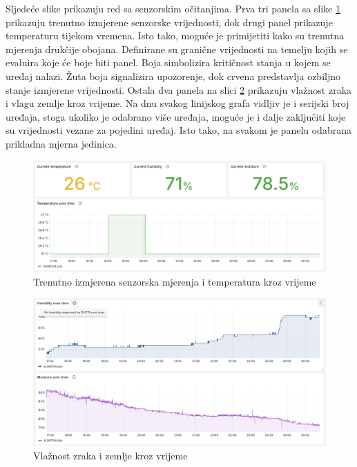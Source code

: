Sljedeće slike prikazuju red sa senzorskim očitanjima. Prva tri panela sa slike \ref{fig:grafana_data_1} prikazuju trenutno izmjerene senzorske vrijednosti, dok drugi panel prikazuje temperaturu tijekom vremena. Isto tako, moguće je primijetiti kako su trenutna mjerenja drukčije obojana. Definirane su granične vrijednosti  na temelju kojih se evaluira koje će boje biti panel. Boja simbolizira kritičnost stanja u kojem se uređaj nalazi. Žuta boja signalizira upozorenje, dok crvena predstavlja ozbiljno stanje izmjerene vrijednosti. Ostala dva panela na slici \ref{fig:grafana_data_2} prikazuju vlažnost zraka i vlagu zemlje kroz vrijeme. Na dnu svakog linijskog grafa vidljiv je i serijski broj uređaja, stoga ukoliko je odabrano više uređaja, moguće je i dalje zaključiti koje su vrijednosti vezane za pojedini uređaj. Isto tako, na svakom je panelu odabrana prikladna mjerna jedinica. 

\begin{figure}[ht]
	\centering
	\includegraphics[scale=0.35]{imgs/grafana_data_1}
	\caption{Trenutno izmjerena senzorska mjerenja i temperatura kroz vrijeme}
	\label{fig:grafana_data_1}
\end{figure}

\begin{figure}[ht]
	\centering
	\includegraphics[scale=0.35]{imgs/grafana_data_2}
	\caption{Vlažnost zraka i zemlje kroz vrijeme}
	\label{fig:grafana_data_2}
\end{figure}

